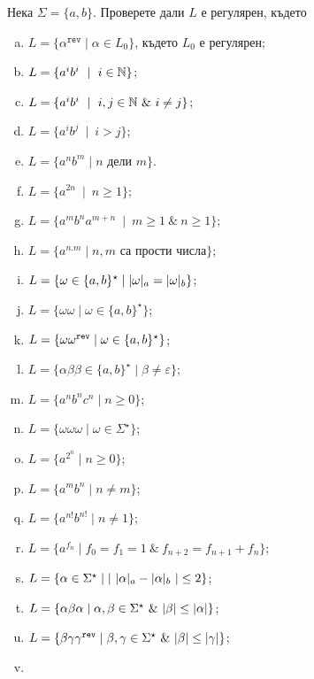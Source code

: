 {\begin{problem}
  Нека $\Sigma = \{a,b\}$.  Проверете дали $L$ е регулярен, където
  \begin{enumerate}[a)]
  \item
    $L = \{\alpha^{\texttt{rev}} \mid \alpha \in L_0\}$, където $L_0$ е регулярен;
  \item
    $L = \{a^ib^i\ \mid\ i\in\Nat\}$;
  \item
    $L = \{a^ib^i\ \mid\ i,j\in\Nat\ \&\ i\neq j\}$;
  \item
    $L = \{a^ib^j\ \mid\ i > j\}$;
  \item
    $L = \{a^nb^m \mid n\mbox{ дели }m\}$.
  \item
    $L = \{a^{2n}\ \mid\ n\geq 1\}$;
  \item
    $L = \{a^mb^na^{m+n}\ \mid\ m\geq 1\ \&\ n\geq 1\}$;
  \item
    $L = \{a^{n.m}\mid n,m\mbox{ са прости числа}\}$;
  \item
    $L = \{\omega\in\{a,b\}^\star \mid \vert{\omega}\vert_{a} = \vert{\omega}\vert_{b}\}$;
  \item
    $L = \{\omega\omega\mid \omega\in\{a,b\}^\star\}$;
  \item
    $L = \{\omega\omega^{\texttt{rev}}\mid \omega\in\{a,b\}^\star\}$;
  \item
    $L = \{\alpha\beta\beta \in \{a,b\}^\star\mid \beta \neq \varepsilon\}$;
  \item
    $L = \{a^nb^nc^n\mid n\geq 0\}$;
  \item
    $L = \{\omega\omega\omega\mid \omega\in \Sigma^\star\}$;
  \item
    $L = \{a^{2^n}\mid n\geq 0\}$;
  \item
    $L = \{a^mb^n\mid n\neq m\}$;
  \item
    $L = \{a^{n!}b^{n!}\mid n\neq 1\}$;
  \item
    $L = \{a^{f_n} \mid f_0 = f_1 = 1\ \&\ f_{n+2} = f_{n+1} + f_{n}\}$;
  \item
    $L = \{\alpha \in \Sigma^\star \mid \vert{\ \vert{\alpha}\vert_{a} - \vert{\alpha}\vert_{b}\ }\vert \leq 2\}$;
  \item
    $L = \{\alpha\beta\alpha \mid \alpha,\beta \in \Sigma^\star\ \&\ \vert{\beta}\vert \leq \vert{\alpha}\vert\}$;
  \item
    $L = \{\beta\gamma\gamma^{\texttt{rev}}\mid \beta, \gamma \in \Sigma^\star\ \&\ \vert{\beta}\vert \leq \vert{\gamma}\vert\}$;
  \item

\end{enumerate}
\end{problem}}
